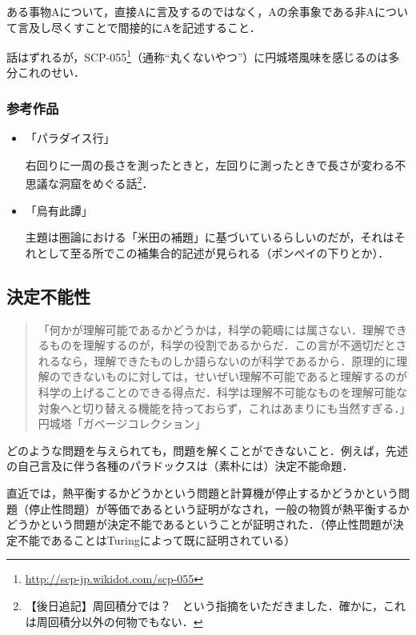 \documentclass[10pt, a5paper, twoside]{jsarticle}
\begin{document}
			ある事物Aについて，直接Aに言及するのではなく，Aの余事象である非Aについて言及し尽くすことで間接的にAを記述すること．

			話はずれるが，SCP-055\footnote{\url{http://scp-jp.wikidot.com/scp-055}}（通称“丸くないやつ”）に円城塔風味を感じるのは多分これのせい．

			\subsubsection*{参考作品}

				\begin{itemize}

					\item 「パラダイス行」

						右回りに一周の長さを測ったときと，左回りに測ったときで長さが変わる不思議な洞窟をめぐる話\footnote{【後日追記】周回積分では？　という指摘をいただきました．確かに，これは周回積分以外の何物でもない．}．

					\item 「烏有此譚」

						主題は圏論における「米田の補題」に基づいているらしいのだが，それはそれとして至る所でこの補集合的記述が見られる（ポンペイの下りとか）．

				\end{itemize}

		\subsection{決定不能性}

			\begin{quote}

				「何かが理解可能であるかどうかは，科学の範疇には属さない．理解できるものを理解するのが，科学の役割であるからだ．この言が不適切だとされるなら，理解できたものしか語らないのが科学であるから．原理的に理解のできないものに対しては，せいぜい理解不可能であると理解するのが科学の上げることのできる得点だ．科学は理解不可能なものを理解可能な対象へと切り替える機能を持っておらず，これはあまりにも当然すぎる．」\hspace{\fill}円城塔「ガベージコレクション」

			\end{quote}

			どのような問題を与えられても，問題を解くことができないこと．例えば，先述の自己言及に伴う各種のパラドックスは（素朴には）決定不能命題．

			直近では，熱平衡するかどうかという問題と計算機が停止するかどうかという問題（停止性問題）が等価であるという証明がなされ，一般の物質が熱平衡するかどうかという問題が決定不能であるということが証明された．（停止性問題が決定不能であることはTuringによって既に証明されている）
\end{document}
